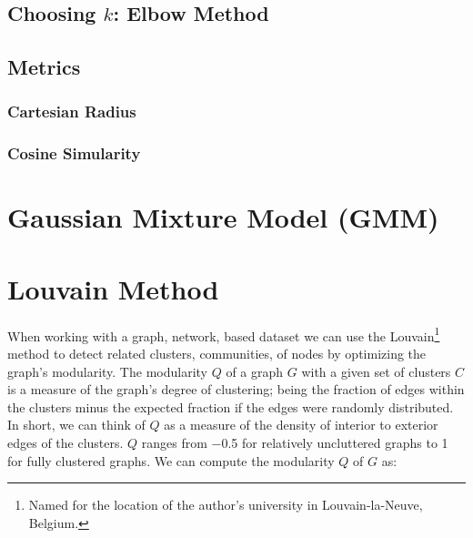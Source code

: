 \subsection{Choosing \texorpdfstring{$k$}{k}: Elbow Method}
\label{cluster:kMean:elbow}

\subsection{Metrics}
\label{cluster:kMean:metrics}

\subsubsection{Cartesian Radius}
\label{cluster:kMean:metrics:cartesian}


\subsubsection{Cosine Simularity}
\label{cluster:kMean:metrics:cos}


\section{Gaussian Mixture Model (GMM)}
\label{cluster:GMM}

\section{Louvain Method}
\label{cluster:louvain}

When working with a graph, \ie network, based dataset
we can use the Louvain\footnote{Named for the location of the author's university in Louvain-la-Neuve, Belgium.} method \cite{louvain}
to detect related clusters, \ie communities,
of nodes by optimizing the graph's modularity.
The modularity $Q$ of a graph $G$ with a given set of clusters $C$
is a measure of the graph's degree of clustering;
being the fraction of edges within the clusters
minus the expected fraction if the edges were randomly distributed.
In short, we can think of $Q$ as a measure of
the density of interior to exterior edges of the clusters.
$Q$ ranges from \num{-0.5} for relatively uncluttered graphs
to \num{1} for fully clustered graphs.
We can compute the modularity $Q$ of $G$ as:

